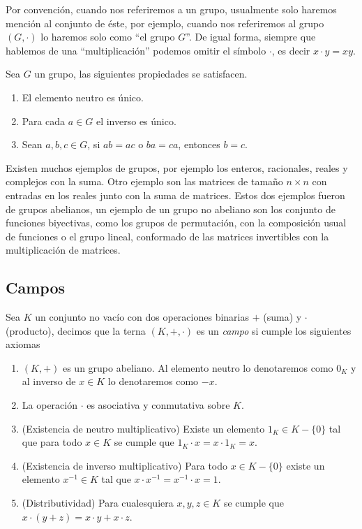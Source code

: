 Por convención, cuando nos referiremos a un grupo, usualmente solo haremos mención al conjunto de éste, por ejemplo, cuando nos referiremos al grupo $(G, \cdot)$ lo haremos solo como ``el grupo $G$''. De igual forma, siempre que hablemos de una ``multiplicación'' podemos omitir el símbolo $\cdot$, es decir $x \cdot y = xy$.

\begin{teor}
  Sea $G$ un grupo, las siguientes propiedades se satisfacen.
    \begin{enumerate}
      \item El elemento neutro es único.
      \item Para cada $a \in G$ el inverso es único.
      \item Sean $a,b,c \in G$, si $ab=ac$ o $ba=ca$, entonces $b=c$.
    \end{enumerate}
\end{teor}

Existen muchos ejemplos de grupos, por ejemplo los enteros, racionales, reales y complejos con la suma. Otro ejemplo son las matrices de tamaño $n \times n$ con entradas en los reales junto con la suma de matrices. Estos dos ejemplos fueron de  grupos abelianos, un ejemplo de un grupo no abeliano son los conjunto de funciones biyectivas, como los grupos de permutación, con la composición usual de funciones o el grupo lineal, conformado de las matrices invertibles con la multiplicación de matrices.

\subsection{Campos}

\begin{defi}
  Sea $K$ un conjunto no vacío con dos operaciones binarias $+$ (suma) y $\cdot$ (producto), decimos que la terna $(K, +, \cdot)$ es un \emph{campo} si cumple los siguientes axiomas
  \begin{enumerate}
    \item $(K,+)$ es un grupo abeliano. Al elemento neutro lo denotaremos como $0_K$ y al inverso de $x \in K$ lo denotaremos como $-x$.
    \item La operación $\cdot$ es asociativa y conmutativa sobre $K$.
    \item (Existencia de neutro multiplicativo) Existe un elemento $1_K \in K-\{0\}$ tal que para todo $x \in K$ se cumple que $1_K\cdot x = x\cdot 1_K = x$.
    \item (Existencia de inverso multiplicativo) Para todo $x \in K-\{0\}$ existe un elemento $ x^{-1} \in K$ tal que $x \cdot x^{-1} = x^{-1} \cdot x = 1$.
    \item (Distributividad) Para cualesquiera $x, y, z \in K$ se cumple que $x \cdot (y + z) = x \cdot y + x \cdot z$.
  \end{enumerate}
\end{defi}

